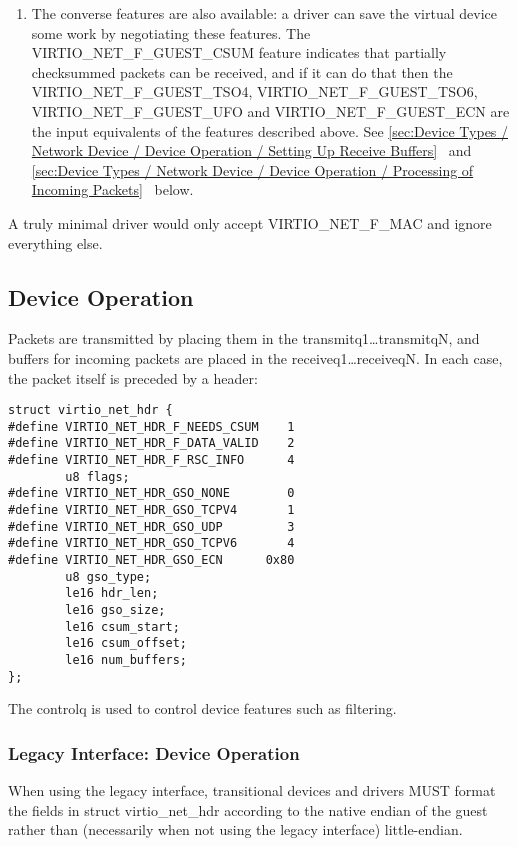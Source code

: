 \begin{enumerate}
\item The converse features are also available: a driver can save
  the virtual device some work by negotiating these features.
   The VIRTIO_NET_F_GUEST_CSUM feature indicates that partially
  checksummed packets can be received, and if it can do that then
  the VIRTIO_NET_F_GUEST_TSO4, VIRTIO_NET_F_GUEST_TSO6,
  VIRTIO_NET_F_GUEST_UFO and VIRTIO_NET_F_GUEST_ECN are the input
  equivalents of the features described above.
  See \ref{sec:Device Types / Network Device / Device Operation /
Setting Up Receive Buffers}~ and
\ref{sec:Device Types / Network Device / Device Operation /
Processing of Incoming Packets}~ below.
\end{enumerate}

A truly minimal driver would only accept VIRTIO_NET_F_MAC and ignore
everything else.

\subsection{Device Operation}\label{sec:Device Types / Network Device / Device Operation}

Packets are transmitted by placing them in the
transmitq1\ldots transmitqN, and buffers for incoming packets are
placed in the receiveq1\ldots receiveqN. In each case, the packet
itself is preceded by a header:

\begin{lstlisting}
struct virtio_net_hdr {
#define VIRTIO_NET_HDR_F_NEEDS_CSUM    1
#define VIRTIO_NET_HDR_F_DATA_VALID    2
#define VIRTIO_NET_HDR_F_RSC_INFO      4
        u8 flags;
#define VIRTIO_NET_HDR_GSO_NONE        0
#define VIRTIO_NET_HDR_GSO_TCPV4       1
#define VIRTIO_NET_HDR_GSO_UDP         3
#define VIRTIO_NET_HDR_GSO_TCPV6       4
#define VIRTIO_NET_HDR_GSO_ECN      0x80
        u8 gso_type;
        le16 hdr_len;
        le16 gso_size;
        le16 csum_start;
        le16 csum_offset;
        le16 num_buffers;
};
\end{lstlisting}

The controlq is used to control device features such as
filtering.

\subsubsection{Legacy Interface: Device Operation}\label{sec:Device Types / Network Device / Device Operation / Legacy Interface: Device Operation}
When using the legacy interface, transitional devices and drivers
MUST format the fields in struct virtio_net_hdr
according to the native endian of the guest rather than
(necessarily when not using the legacy interface) little-endian.

